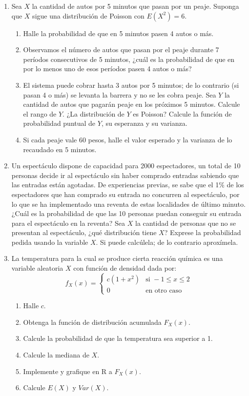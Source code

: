 \documentclass[a4paper, 11pt]{article}
\begin{document}
\begin{enumerate}
    \item Sea $X$ la cantidad de autos por 5 minutos que pasan por un peaje. Suponga que $X$ sigue una distribución de Poisson con $E(X^2) = 6$.
    \begin{enumerate}
        \item Halle la probabilidad de que en 5 minutos pasen 4 autos o más.
        \item Observamos el número de autos que pasan por el peaje durante 7 períodos consecutivos de 5 minutos, ¿cuál es la probabilidad de que en por lo menos uno de esos períodos pasen 4 autos o más?
        \item El sistema puede cobrar hasta 3 autos por 5 minutos; de lo contrario (si pasan 4 o más) se levanta la barrera y no se les cobra peaje. Sea $Y$ la cantidad de autos que pagarán peaje en los próximos 5 minutos. Calcule el rango de $Y$. ¿La distribución de $Y$ es Poisson? Calcule la función de probabilidad puntual de $Y$, su esperanza y su varianza.
        \item Si cada peaje vale 60 pesos, halle el valor esperado y la varianza de lo recaudado en 5 minutos.
    \end{enumerate}
    
    \item Un espectáculo dispone de capacidad para 2000 espectadores, un total de 10 personas decide ir al espectáculo sin haber comprado entradas sabiendo que las entradas están agotadas. De experiencias previas, se sabe que el 1\% de los espectadores que han comprado su entrada no concurren al espectáculo, por lo que se ha implementado una reventa de estas localidades de último minuto. ¿Cuál es la probabilidad de que las 10 personas puedan conseguir su entrada para el espectáculo en la reventa? Sea $X$ la cantidad de personas que no se presentan al espectáculo, ¿qué distribución tiene $X$? Exprese la probabilidad pedida usando la variable $X$. Si puede calcúlela; de lo contrario aproxímela.
    
    \item La temperatura para la cual se produce cierta reacción química es una variable aleatoria $X$ con función de densidad dada por:
    \[
    f_X(x) = 
    \begin{cases}
    c(1 + x^2) & \text{si } -1 \leq x \leq 2 \\
    0 & \text{en otro caso}
    \end{cases}
    \]
    \begin{enumerate}
        \item Halle $c$.
        \item Obtenga la función de distribución acumulada $F_X(x)$.
        \item Calcule la probabilidad de que la temperatura sea superior a 1.
        \item Calcule la mediana de $X$.
        \item Implemente y grafique en R a $F_X(x)$.
        \item Calcule $E(X)$ y $Var(X)$.
    \end{enumerate}
    

\end{enumerate}
\end{document}
